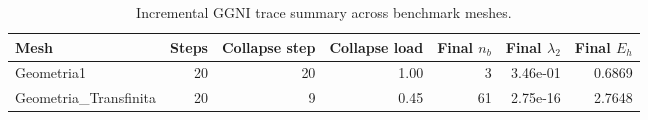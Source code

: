 \begin{table}[htbp]
\centering
\caption{Incremental GGNI trace summary across benchmark meshes.}
\label{tab:ggni_trace_summary}
\begin{tabular}{lrrrrrr}
\toprule
Mesh & Steps & Collapse step & Collapse load & Final $n_b$ & Final $\lambda_2$ & Final $E_h$ \\
\midrule
Geometria1 & 20 & 20 & 1.00 & 3 & 3.46e-01 & 0.6869 \\
Geometria\_Transfinita & 20 & 9 & 0.45 & 61 & 2.75e-16 & 2.7648 \\
\bottomrule
\end{tabular}
\end{table}